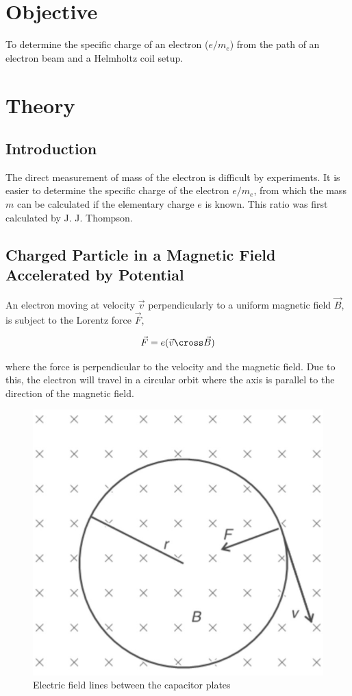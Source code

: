 \section{Objective}
To determine the specific charge of an electron ($e/m_e$) from the path of an electron beam and a Helmholtz coil setup.

\section{Theory}

\subsection*{Introduction}

The direct measurement of mass of the electron is difficult by experiments. It is easier to
determine the specific charge of the electron $e/m_e$, from which the mass $m$ can be calculated if
the elementary charge $e$ is known. This ratio was first calculated by J. J. Thompson.

\subsection{Charged Particle in a Magnetic Field Accelerated by Potential}
An electron moving at velocity $\Vec{v}$ perpendicularly to a
uniform magnetic field $\Vec{B}$, is subject to the
Lorentz force $\Vec{F}$,

\begin{align}
    \Vec{F} = e(\Vec{v}\cross\Vec{B})
\end{align}

where the force is perpendicular to the velocity and the magnetic field. Due to this, the electron will travel in a circular orbit where the axis is parallel to the direction of the magnetic field. 

\begin{figure}[H]
    \centering
    \includegraphics[height=0.5\columnwidth]{images/f1.png}
    \caption{Electric field lines between the capacitor plates}
    \label{fig:1}
\end{figure}

